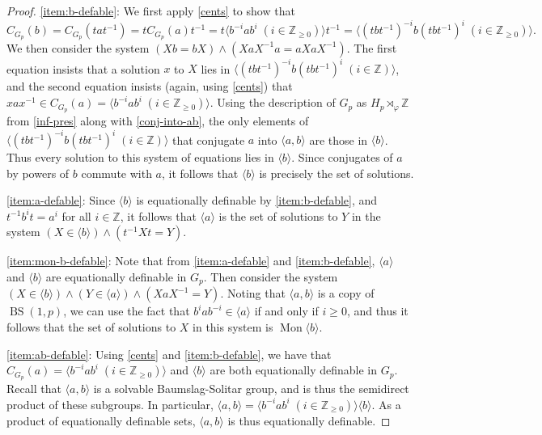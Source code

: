 \documentclass[11pt]{amsart}
\theoremstyle{definition}
\numberwithin{theorem}{section}
\DeclareMathOperator{\Mon}{Mon}
\DeclareMathOperator{\BS}{BS}
\newcommand{\Z}{\mathbb{Z}}
\begin{document}
\begin{proof}
 	\eqref{item:b-defable}: We first apply \cref{cents} to show that
	\[
			C_{G_p}(b) = C_{G_p}(tat^{-1}) = t C_{G_p}(a) t^{-1}
			= t \langle b^{-i} a b^i \; (i \in \Z_{\geq 0}) \rangle t^{-1}
					= \langle  (tbt^{-1})^{-i} b (tbt^{-1})^i \; (i \in \Z_{\geq 0}) \rangle.
	\]
	We then consider the system \((Xb = bX) \wedge (XaX^{-1} a = a XaX^{-1})\).
	The first equation insists that a solution \(x\) to \(X\) lies in \(\langle
	(tbt^{-1})^{-i} b (tbt^{-1})^i \; (i \in \Z)\rangle\), and the second
	equation insists (again, using \cref{cents}) that \(xax^{-1} \in C_{G_p}(a)
	=  \langle b^{-i} a b^i \; (i \in \Z_{\geq 0}) \rangle\). Using the
	description of \(G_p\) as \(H_p \rtimes_\varphi \Z\) from
	\cref{inf-pres}
	along with
	\cref{conj-into-ab}, the only elements of \(\langle (tbt^{-1})^{-i} b (tbt^{-1})^i \;
	(i \in \Z)\rangle\) that conjugate \(a\) into \(\langle a, b \rangle\) are
	those in \(\langle b \rangle\). Thus every solution to this system of
	equations lies in \(\langle b \rangle\).  Since conjugates of \(a\) by
	powers of \(b\) commute with \(a\), it follows that \(\langle b \rangle\)
	is precisely the set of solutions.

	\eqref{item:a-defable}: Since \(\langle b \rangle\) is equationally
	definable by \eqref{item:b-defable}, and \(t^{-1} b^i t = a^i\) for all \(i
	\in \Z\), it follows that \(\langle a \rangle\) is the set of solutions to
	\(Y\) in the system \((X \in \langle b \rangle) \wedge (t^{-1} X t = Y)\).

	\eqref{item:mon-b-defable}: Note that from \eqref{item:a-defable} and
	\eqref{item:b-defable}, \(\langle a \rangle\) and \(\langle b \rangle\) are
	equationally definable in \(G_p\). Then consider the system \((X \in
	\langle b \rangle) \wedge (Y \in \langle a \rangle) \wedge (X aX^{-1} =
	Y)\). Noting that \(\langle a, b \rangle\) is a copy of \(\BS(1, p)\), we
	can use the fact that \(b^i a b^{-i} \in \langle a \rangle\) if and only if
	\(i \geq 0\), and thus it follows that the set of solutions to \(X\) in
	this system is \(\Mon\langle b \rangle\).

	\eqref{item:ab-defable}: Using \cref{cents} and \eqref{item:b-defable}, 
	we have that \(C_{G_p}(a) = \langle b^{-i} a b^i \; (i \in \Z_{\geq 0}) \rangle\)
	and \(\langle b \rangle\) are both equationally definable in \(G_p\).
	Recall that \(\langle a, b \rangle\) is a solvable Baumslag-Solitar group,
	and is thus the semidirect product of these subgroups. In particular,
	\(\langle a, b \rangle = \langle b^{-i} a b^i \; (i \in \Z_{\geq 0}) \rangle
	\langle b \rangle\). As a product of equationally definable sets,
	\(\langle a, b \rangle\) is thus equationally definable.


\end{proof}
\end{document}
